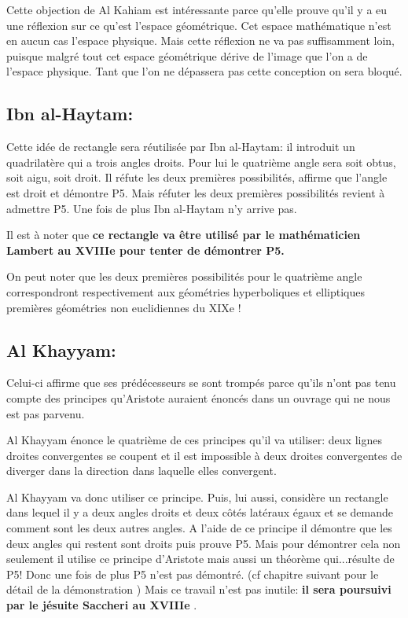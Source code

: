 \documentclass[a4paper, 12pt, twoside]{book}
\begin{document}
 Cette objection de Al Kahiam est intéressante parce qu'elle prouve qu'il y a eu une réflexion sur ce qu'est l'espace géométrique. Cet espace mathématique n'est en aucun cas l'espace physique. Mais cette réflexion ne va pas suffisamment loin, puisque malgré tout cet espace géométrique dérive de l'image que l'on a de l'espace physique. Tant que l'on ne dépassera pas cette conception on sera bloqué.\\
 
  
  \subsection{Ibn al-Haytam:}

   Cette idée de rectangle sera réutilisée par  Ibn al-Haytam: il introduit un quadrilatère qui a trois angles droits. Pour lui le quatrième angle sera soit obtus, soit aigu, soit droit. Il réfute les deux premières possibilités, affirme que l'angle est droit et démontre P5. 
   Mais réfuter les deux premières possibilités revient à admettre P5. Une fois de plus Ibn al-Haytam n'y arrive pas.\
   
    Il est à noter que \textbf{ce rectangle va être utilisé par le mathématicien Lambert au XVIIIe pour tenter de démontrer P5.}

On peut noter que les deux premières possibilités pour le quatrième angle correspondront respectivement aux géométries hyperboliques et elliptiques premières géométries non euclidiennes du XIXe !  

\subsection{Al Khayyam:}


Celui-ci affirme que ses prédécesseurs se sont trompés parce qu'ils n'ont pas tenu compte des principes qu'Aristote auraient énoncés dans un ouvrage qui ne nous est pas parvenu.\

Al Khayyam énonce le quatrième de ces principes qu'il va utiliser: deux lignes droites convergentes se coupent et il est impossible à deux droites convergentes de diverger dans la direction dans laquelle elles convergent.

   Al Khayyam va donc utiliser ce principe. Puis, lui aussi, considère un rectangle dans lequel il y a deux angles droits et deux côtés latéraux égaux et se demande comment sont les deux autres angles. A l'aide de ce principe il démontre que les deux angles qui restent sont droits puis prouve P5. Mais pour démontrer cela non seulement il utilise ce principe  d'Aristote mais aussi un théorème qui...résulte de P5! Donc une fois de plus P5 n'est pas démontré. (cf chapitre suivant pour le détail de la démonstration )
    Mais ce travail n'est pas inutile: \textbf{il sera poursuivi par le jésuite Saccheri au XVIIIe }.
 
\end{document}

